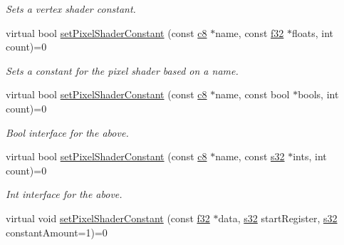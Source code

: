 \begin{DoxyCompactItemize}
\begin{DoxyCompactList}\small\item\em Sets a vertex shader constant. \end{DoxyCompactList}\item 
virtual bool \hyperlink{classirr_1_1video_1_1IMaterialRendererServices_a6f612293300f643148bd537a8a70ff32}{set\+Pixel\+Shader\+Constant} (const \hyperlink{namespaceirr_a9395eaea339bcb546b319e9c96bf7410}{c8} $\ast$name, const \hyperlink{namespaceirr_a0277be98d67dc26ff93b1a6a1d086b07}{f32} $\ast$floats, int count)=0
\begin{DoxyCompactList}\small\item\em Sets a constant for the pixel shader based on a name. \end{DoxyCompactList}\item 
\mbox{\label{classirr_1_1video_1_1IMaterialRendererServices_a252ccc1a6055f784c252435e1427de1b}} 
virtual bool \hyperlink{classirr_1_1video_1_1IMaterialRendererServices_a252ccc1a6055f784c252435e1427de1b}{set\+Pixel\+Shader\+Constant} (const \hyperlink{namespaceirr_a9395eaea339bcb546b319e9c96bf7410}{c8} $\ast$name, const bool $\ast$bools, int count)=0
\begin{DoxyCompactList}\small\item\em Bool interface for the above. \end{DoxyCompactList}\item 
\mbox{\label{classirr_1_1video_1_1IMaterialRendererServices_ac81171c7c59a9cf0fc7d76de910098f4}} 
virtual bool \hyperlink{classirr_1_1video_1_1IMaterialRendererServices_ac81171c7c59a9cf0fc7d76de910098f4}{set\+Pixel\+Shader\+Constant} (const \hyperlink{namespaceirr_a9395eaea339bcb546b319e9c96bf7410}{c8} $\ast$name, const \hyperlink{namespaceirr_ac66849b7a6ed16e30ebede579f9b47c6}{s32} $\ast$ints, int count)=0
\begin{DoxyCompactList}\small\item\em Int interface for the above. \end{DoxyCompactList}\item 
virtual void \hyperlink{classirr_1_1video_1_1IMaterialRendererServices_af962cb878f57d1edbc0030fedb464d1d}{set\+Pixel\+Shader\+Constant} (const \hyperlink{namespaceirr_a0277be98d67dc26ff93b1a6a1d086b07}{f32} $\ast$data, \hyperlink{namespaceirr_ac66849b7a6ed16e30ebede579f9b47c6}{s32} start\+Register, \hyperlink{namespaceirr_ac66849b7a6ed16e30ebede579f9b47c6}{s32} constant\+Amount=1)=0

\end{DoxyCompactItemize}
